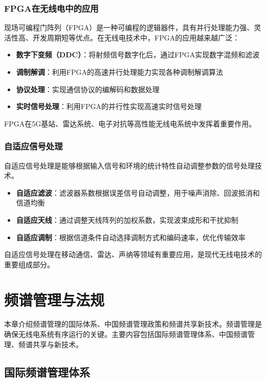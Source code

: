 \documentclass[12pt,UTF8]{ctexbook}
\begin{document}
\subsection{FPGA在无线电中的应用}

现场可编程门阵列（FPGA）是一种可编程的逻辑器件，具有并行处理能力强、灵活性高、开发周期短等优点。在无线电技术中，FPGA的应用越来越广泛：

\begin{itemize}[leftmargin=3.5em]
    \item \textbf{数字下变频（DDC）}：将射频信号数字化后，通过FPGA实现数字混频和滤波
    \item \textbf{调制解调}：利用FPGA的高速并行处理能力实现各种调制解调算法
    \item \textbf{协议处理}：实现通信协议的编解码和数据处理
    \item \textbf{实时信号处理}：利用FPGA的并行性实现高速实时信号处理
\end{itemize}

FPGA在5G基站、雷达系统、电子对抗等高性能无线电系统中发挥着重要作用。

\subsection{自适应信号处理}

自适应信号处理是能够根据输入信号和环境的统计特性自动调整参数的信号处理技术。

\begin{itemize}[leftmargin=3.5em]
    \item \textbf{自适应滤波}：滤波器系数根据误差信号自动调整，用于噪声消除、回波抵消和信道均衡
    \item \textbf{自适应天线}：通过调整天线阵列的加权系数，实现波束成形和干扰抑制
    \item \textbf{自适应调制}：根据信道条件自动选择调制方式和编码速率，优化传输效率
\end{itemize}

自适应信号处理在移动通信、雷达、声纳等领域有重要应用，是现代无线电技术的重要组成部分。

\chapter{频谱管理与法规}

本章介绍频谱管理的国际体系、中国频谱管理政策和频谱共享新技术。频谱管理是确保无线电系统有序运行的关键。主要内容包括国际频谱管理体系、中国频谱管理、频谱共享与新技术。

\section{国际频谱管理体系}
\end{document}
